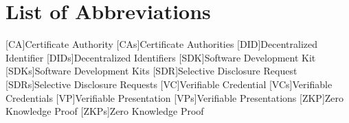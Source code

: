 \chapter*{List of Abbreviations}
    \begin{acronym}[SDK]
        [CA]{Certificate Authority}
        [CAs]{Certificate Authorities}
        [DID]{Decentralized Identifier}
        [DIDs]{Decentralized Identifiers}
        [SDK]{Software Development Kit}
        [SDKs]{Software Development Kits}
        [SDR]{Selective Disclosure Request}
        [SDRs]{Selective Disclosure Requests}
        [VC]{Verifiable Credential}
        [VCs]{Verifiable Credentials}
        [VP]{Verifiable Presentation}
        [VPs]{Verifiable Presentations}
        [ZKP]{Zero Knowledge Proof}
        [ZKPs]{Zero Knowledge Proof}
    \end{acronym}

\pagestyle{fancy}







\newpage
\lhead{}
\rhead{\leftmark}


\appendix




